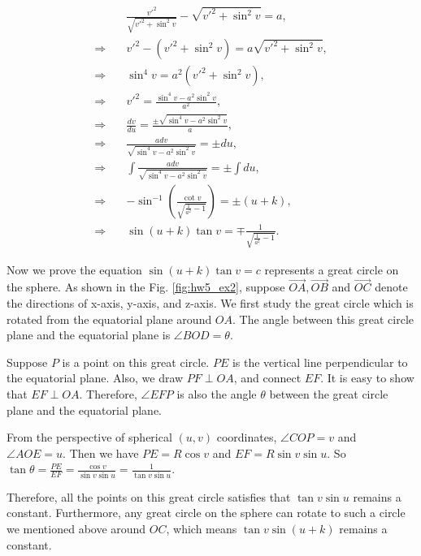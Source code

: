 \documentclass[
  course = {{16-811 Math Fundamentals for Robotics}},
  quartile = {{1}},
  assignment = 5,
  name = {{Kangle Deng}},
  email = {{kangled@andrew.cmu.edu}},
  firstexercise = 1
]{aga-homework}
\begin{document}
\begin{equation*}
\begin{aligned}
 &     \frac{v'^2}{\sqrt{v'^2+\sin^2v}} - \sqrt{v'^2 + \sin^2v} = a, \\
 \Rightarrow \quad & v'^2 - (v'^2 + \sin^2v) = a\sqrt{v'^2+\sin^2v}, \\
  \Rightarrow \quad & \sin^4v = a^2 (v'^2 + \sin^2v), \\
   \Rightarrow \quad & v'^2 = \frac{\sin^4 v - a^2\sin^2 v}{a^2}, \\
    \Rightarrow \quad & \frac{dv}{du} = \frac{\pm \sqrt{\sin^4 v - a^2\sin^2 v}}{a}, \\
\Rightarrow \quad & \frac{adv}{\sqrt{\sin^4 v - a^2\sin^2 v}} = \pm du, \\
\Rightarrow \quad & \int \frac{adv}{\sqrt{\sin^4 v - a^2\sin^2 v}} = \pm \int du, \\
\Rightarrow \quad & -\sin^{-1} (\frac{\cot v}{\sqrt{\frac{1}{a^2} - 1}}) = \pm (u + k), \\
\Rightarrow \quad & \sin(u+k)\tan v = \mp \frac{1}{\sqrt{\frac{1}{a^2} - 1}}.
\end{aligned}

\end{equation*}

Now we prove the equation $\sin(u+k)\tan v = c$ represents a great circle on the sphere. As shown in the Fig. \ref{fig:hw5_ex2}, suppose $\vec{OA}, \vec{OB}$ and $\vec{OC}$ denote the directions of x-axis, y-axis, and z-axis. We first study the great circle which is rotated from the equatorial plane around $OA$. The angle between this great circle plane and the equatorial plane is $\angle BOD = \theta$.

Suppose $P$ is a point on this great circle. $PE$ is the vertical line perpendicular to the equatorial plane. Also, we draw $PF \perp OA$, and connect $EF$. It is easy to show that $EF \perp OA$. Therefore, $\angle EFP$ is also the angle $\theta$ between the great circle plane and the equatorial plane.

From the perspective of spherical $(u,v)$ coordinates, $\angle COP = v$ and $\angle AOE = u$. Then we have $PE = R \cos v$ and $EF = R \sin v \sin u$. So $\tan \theta = \frac{PE}{EF} = \frac{\cos v}{\sin v \sin u} = \frac{1}{\tan v \sin u}$.

Therefore, all the points on this great circle satisfies that $\tan v \sin u$ remains a constant. Furthermore, any great circle on the sphere can rotate to such a circle we mentioned above around $OC$, which means $\tan v \sin (u+k)$ remains a constant.
\end{document}
